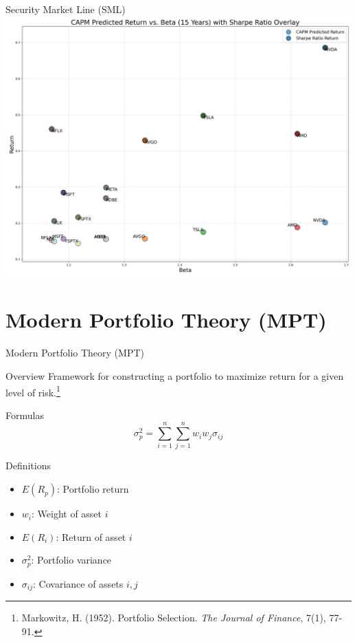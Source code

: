 \documentclass{beamer}
\begin{document}
\begin{frame}{Security Market Line (SML)}
    \centering
    \includegraphics[height=0.8\textheight]{capm_vs_sharpe_15_years.png}
\end{frame}


\section{Modern Portfolio Theory (MPT)}
\begin{frame}{Modern Portfolio Theory (MPT)}
    \begin{block}{Overview}
        Framework for constructing a portfolio to maximize return for a given level of risk.\footnote{Markowitz, H. (1952). Portfolio Selection. \textit{The Journal of Finance}, 7(1), 77-91.}
    \end{block}
    \begin{block}{Formulas}
            \begin{equation*}
                \sigma_p^2 = \sum_{i=1}^{n} \sum_{j=1}^{n} w_i w_j \sigma_{ij}
            \end{equation*}
    \end{block}
    \begin{block}{Definitions}
        \begin{multicols}{2}
            \begin{itemize}
                \item \(E(R_p)\): Portfolio return
                \item \(w_i\): Weight of asset \(i\)
                \item \(E(R_i)\): Return of asset \(i\)
                \item \(\sigma_p^2\): Portfolio variance
                \item \(\sigma_{ij}\): Covariance of assets \(i, j\)
            \end{itemize}
        \end{multicols}
    \end{block}
\end{frame}
\end{document}
